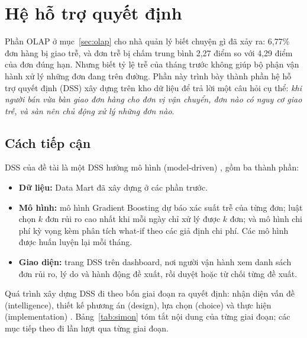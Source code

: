 \section{Hệ hỗ trợ quyết định}\label{sec:dss}

Phần OLAP ở mục~\ref{sec:olap} cho nhà quản lý biết chuyện gì đã xảy ra: 6,77\% đơn hàng bị giao trễ, và đơn trễ bị chấm trung bình 2,27 điểm so với 4,29 điểm của đơn đúng hạn. Nhưng biết tỷ lệ trễ của tháng trước không giúp bộ phận vận hành xử lý những đơn đang trên đường. Phần này trình bày thành phần hệ hỗ trợ quyết định (DSS) xây dựng trên kho dữ liệu để trả lời một câu hỏi cụ thể: \textit{khi người bán vừa bàn giao đơn hàng cho đơn vị vận chuyển, đơn nào có nguy cơ giao trễ, và sàn nên chủ động xử lý những đơn nào}.

\subsection{Cách tiếp cận}

DSS của đề tài là một DSS hướng mô hình (model-driven) \cite{turban}, gồm ba thành phần:
\begin{itemize}
    \item \textbf{Dữ liệu:} Data Mart đã xây dựng ở các phần trước.
    \item \textbf{Mô hình:} mô hình Gradient Boosting dự báo xác suất trễ của từng đơn; luật chọn $k$ đơn rủi ro cao nhất khi mỗi ngày chỉ xử lý được $k$ đơn; và mô hình chi phí kỳ vọng kèm phân tích what-if theo các giả định chi phí. Các mô hình được huấn luyện lại mỗi tháng.
    \item \textbf{Giao diện:} trang DSS trên dashboard, nơi người vận hành xem danh sách đơn rủi ro, lý do và hành động đề xuất, rồi duyệt hoặc từ chối từng đề xuất.
\end{itemize}

Quá trình xây dựng DSS đi theo bốn giai đoạn ra quyết định: nhận diện vấn đề (intelligence), thiết kế phương án (design), lựa chọn (choice) và thực hiện (implementation) \cite{turban}. Bảng~\ref{tab:simon} tóm tắt nội dung của từng giai đoạn; các mục tiếp theo đi lần lượt qua từng giai đoạn.

